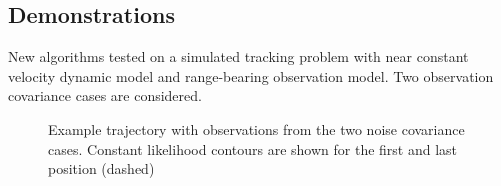 \documentclass[landscape]{sciposter}
\begin{document}
\begin{multicols}{4}

\section*{Demonstrations}

New algorithms tested on a simulated tracking problem with near constant velocity dynamic model and range-bearing observation model. Two observation covariance cases are considered.
%
\begin{figure}
\centering
{}
\caption{Example trajectory with observations from the two noise covariance cases. Constant likelihood contours are shown for the first and last position (dashed)}
\end{figure}


\end{multicols}
\end{document}
